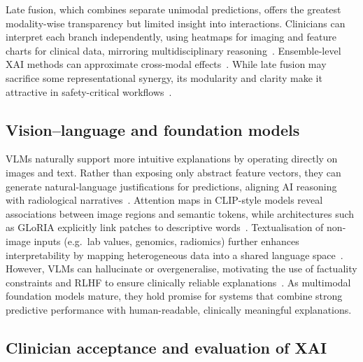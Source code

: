 \documentclass[final,british,a4paper,12pt]{phdthesis}
\begin{document}
Late fusion, which combines separate unimodal predictions, offers the greatest modality-wise transparency but limited insight into interactions. Clinicians can interpret each branch independently, using heatmaps for imaging and feature charts for clinical data, mirroring multidisciplinary reasoning~\cite{abgrall2024should}. Ensemble-level XAI methods can approximate cross-modal effects~\cite{sharma2025xai}. While late fusion may sacrifice some representational synergy, its modularity and clarity make it attractive in safety-critical workflows~\cite{abgrall2024should}.

\subsection{Vision–language and foundation models}

VLMs naturally support more intuitive explanations by operating directly on images and text. Rather than exposing only abstract feature vectors, they can generate natural-language justifications for predictions, aligning AI reasoning with radiological narratives~\cite{sharma2025xai,pahud2024orchestrating}. Attention maps in CLIP-style models reveal associations between image regions and semantic tokens, while architectures such as GLoRIA explicitly link patches to descriptive words~\cite{napravnik2025lessons,huang2021gloria}. Textualisation of non-image inputs (e.g.\ lab values, genomics, radiomics) further enhances interpretability by mapping heterogeneous data into a shared language space~\cite{sharma2025xai}. However, VLMs can hallucinate or overgeneralise, motivating the use of factuality constraints and RLHF to ensure clinically reliable explanations~\cite{pahud2024orchestrating}. As multimodal foundation models mature, they hold promise for systems that combine strong predictive performance with human-readable, clinically meaningful explanations.

\subsection{Clinician acceptance and evaluation of XAI}
\end{document}
